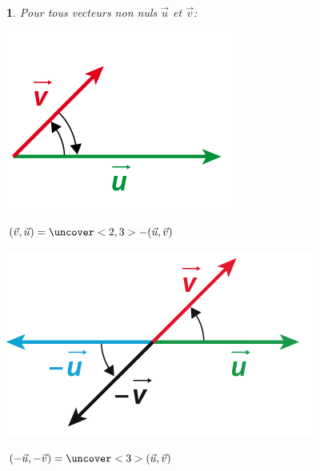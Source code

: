 \documentclass{beamer}
\newtheorem{proposition}[theorem]{\translate{Proposition}}
\theoremstyle{plain}
\begin{document}
 \begin{frame}
  
  \begin{proposition}
 Pour tous vecteurs non nuls $\vec{u}$ et $\vec{v}$:
 \begin{multicols}{2}
  
  
  \begin{center}
    \includegraphics[scale=0.5]{../Images/moinsuv.png}
    
    $(\vec{v},\vec{u})=\uncover<2,3>{-(\vec{u},\vec{v})}$
  \end{center}
 
  
  \columnbreak 
  
  
  \begin{center}
    \includegraphics[scale=0.5]{../Images/moinsUetmoinsV.png}
    
    $(-\vec{u},-\vec{v})=\uncover<3>{(\vec{u},\vec{v})}$
  \end{center}

  
  \end{multicols}
  

  
\end{proposition}

\end{frame}
\end{document}
